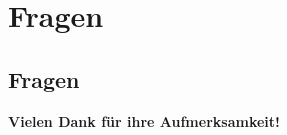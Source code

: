 \section{Fragen}
\subsection{Fragen}
\begin{frame}
\begin{minipage}{\textwidth}
  \begin{center}
    \Huge \textbf{Vielen Dank für ihre Aufmerksamkeit!}
    \vspace{1cm}
  \end{center}
\end{minipage}
\begin{minipage}{\textwidth}
  \begin{center}
  \end{center}
\end{minipage}
\end{frame}


